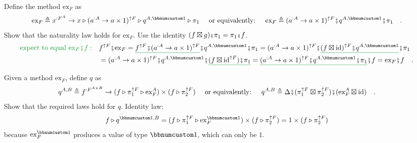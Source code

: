 Define the method $\text{ex}_{F}$ as 
\[
\text{ex}_{F}\triangleq x^{:F^{A}}\rightarrow x\triangleright(a^{:A}\rightarrow a\times1)^{\uparrow F}\triangleright q^{A,\bbnum 1}\triangleright\pi_{1}\quad\text{ or equivalently: }\quad\text{ex}_{F}\triangleq(a^{:A}\rightarrow a\times1)^{\uparrow F}\bef q^{A,\bbnum 1}\bef\pi_{1}\quad.
\]
Show that the naturality law holds for $\text{ex}_{F}$. Use the identity
$(f\boxtimes g)\bef\pi_{1}=\pi_{1}\bef f$.
\begin{align*}
{\color{greenunder}\text{expect to equal }\text{ex}_{F}\bef f:}\quad & f^{\uparrow F}\bef\text{ex}_{F}=\gunderline{f^{\uparrow F}\bef(a^{:A}\rightarrow a\times1)^{\uparrow F}}\bef q^{A,\bbnum 1}\bef\pi_{1}=(a^{:A}\rightarrow a\times1)^{\uparrow F}\bef\gunderline{(f\boxtimes\text{id})^{\uparrow F}\bef q^{A,\bbnum 1}}\bef\pi_{1}\\
 & =(a^{:A}\rightarrow a\times1)^{\uparrow F}\bef q^{A,\bbnum 1}\bef\gunderline{(f\boxtimes\text{id}^{\uparrow F})\bef\pi_{1}}=\gunderline{(a^{:A}\rightarrow a\times1)^{\uparrow F}\bef q^{A,\bbnum 1}\bef\pi_{1}}\bef f=\text{ex}_{F}\bef f\quad.
\end{align*}

Given a method $\text{ex}_{F}$, define $q$ as 
\[
q^{A,B}\triangleq f^{:F^{A\times B}}\rightarrow(f\triangleright\pi_{1}^{\uparrow F}\triangleright\text{ex}_{F}^{A})\times(f\triangleright\pi_{2}^{\uparrow F})\quad\text{ or equivalently: }\quad q^{A,B}\triangleq\Delta\bef(\pi_{1}^{\uparrow F}\boxtimes\pi_{2}^{\uparrow F})\bef(\text{ex}_{F}^{A}\boxtimes\text{id})\quad.
\]
Show that the required laws hold for $q$. Identity law: 
\[
f\triangleright q^{\bbnum 1,B}=(f\triangleright\pi_{1}^{\uparrow F}\triangleright\text{ex}_{F}^{\bbnum 1})\times(f\triangleright\pi_{2}^{\uparrow F})=1\times(f\triangleright\pi_{2}^{\uparrow F})
\]
because $\text{ex}_{F}^{\bbnum 1}$ produces a value of type $\bbnum 1$,
which can only be $1$.

